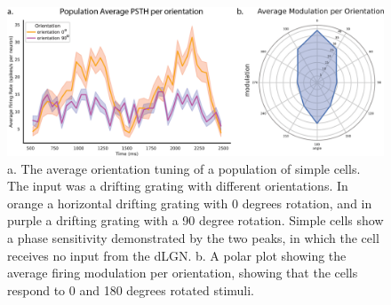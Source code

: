 \documentclass[12pt]{article}
\begin{document}
\begin{figure}[H]
    \centering
    \includegraphics[width=1.0 \textwidth]{figures/figure_simple_orientation_tuning.png}
    \caption{a. The average orientation tuning of a population of simple cells. The input was a drifting grating with different orientations. In orange a horizontal drifting grating with 0 degrees rotation, and in purple a drifting grating with a 90 degree rotation. Simple cells show a phase sensitivity demonstrated by the two peaks, in which the cell receives no input from the dLGN. b. A polar plot showing the average firing modulation per orientation, showing that the cells respond to 0 and 180 degrees rotated stimuli.}
    \label{fig:simple cell orientation tuning}
\end{figure}
\end{document}
